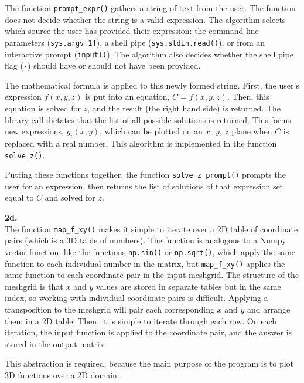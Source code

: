 \documentclass[11pt]{article}
\newcommand{\double}[0]{\par\null\par}
\renewcommand{\section}[1]{\textbf{#1}\\}
\newcommand{\paren}[1]{\left({#1}\right)}
\begin{document}
The function \verb|prompt_expr()| gathers a string of text from the user. The function does not decide whether the string is a valid
expression. The algorithm selects which source the user has provided their expression: the command line
parameters (\verb|sys.argv[1]|), a shell pipe (\verb|sys.stdin.read()|), or from an interactive prompt (\verb|input()|). The
algorithm also decides whether the shell pipe flag (\verb|-|) should have or should not have been provided.\double

The mathematical formula is applied to this newly formed string. First, the user's expression $f\paren{x,y,z}$ is put into an
equation, $C=f\paren{x,y,z}$. Then, this equation is solved for $z$, and the result (the right hand side) is returned. The
library call dictates that the list of all possible solutions is returned. This forms new expressions, $g_i\paren{x,y}$, which
can be plotted on an $x,\ y,\ z$ plane when $C$ is replaced with a real number. This algorithm is implemented in the
function \verb|solve_z()|.\double

Putting these functions together, the function \verb|solve_z_prompt()| prompts the user for an expression, then returns the
list of solutions of that expression set equal to $C$ and solved for $z$.\double

\section{2d.}
The function \verb|map_f_xy()| makes it simple to iterate over a 2D table of coordinate pairs (which is a 3D table of numbers).
The function is analogous to a Numpy vector function, like the functions \verb|np.sin()| or \verb|np.sqrt()|, which apply the
same function to each individual number in the matrix, but \verb|map_f_xy()| applies the same function to each coordinate pair
in the input meshgrid. The structure of the meshgrid is that $x$ and $y$ values are stored in separate tables but in the same
index, so working with individual coordinate pairs is difficult. Applying a transposition to the meshgrid will pair each
corresponding $x$ and $y$ and arrange them in a 2D table. Then, it is simple to iterate through each row. On each iteration,
the input function is applied to the coordinate pair, and the answer is stored in the output matrix.\double

This abstraction is required, because the main purpose of the program is to plot 3D functions over a 2D domain.
\end{document}
